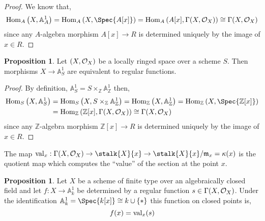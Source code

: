 \documentclass[12pt]{extarticle}
\newcommand{\Hom}[3]{\mathrm{Hom}_{#1}\left( #2, #3 \right)}
\newcommand{\Z}{\mathbb{Z}}
\theoremstyle{definition}
\newtheorem{proposition}[theorem]{Proposition}
\newenvironment{definition}[1][Definition:]{\begin{trivlist}
\item[\hskip \labelsep {\bfseries #1}]}{\end{trivlist}}
\newcommand{\m}{\mathfrak{m}}
\newcommand{\A}{\mathbb{A}}
\begin{document}
\begin{proof}
We know that,
\[ \Hom{A}{X}{\A^1_A} = \Hom{A}{X}{\Spec{A[x]}} = \Hom{A}{A[x]}{\Gamma(X, \struct{X})} \cong \Gamma(X, \struct{X}) \]
since any $A$-algebra morphism $A[x] \to R$ is determined uniquely by the image of $x \in R$. 
\end{proof}

\begin{proposition}
Let $(X, \mathcal{O}_{X})$ be a locally ringed space over a scheme $S$. Then morphisms $X \to \A^1_S$ are equivalent to regular functions.
\end{proposition}

\begin{proof}
By definition, $\A^1_S = S \times_\Z \A^1_\Z$ then,
\begin{align*}
\Hom{S}{X}{\A^1_S} & = \Hom{S}{X}{S \times_\Z \A^1_\Z} = \Hom{\Z}{X}{\A^1_\Z} = \Hom{\Z}{X}{\Spec{\Z[x]}} 
\\
& = \Hom{\Z}{\Z[x]}{\Gamma(X, \struct{X})} \cong \Gamma(X, \struct{X})
\end{align*}
since any $\Z$-algebra morphism $\Z[x] \to R$ is determined uniquely by the image of $x \in R$. 
\end{proof}

\begin{definition}
The map $\val_x : \Gamma(X, \struct{X}) \to \stalk{X}{x} \to \stalk{X}{x} / \m_x = \kappa(x)$ is the quotient map which computes the ``value'' of the section at the point $x$. 
\end{definition}


\begin{proposition}
Let $X$ be a scheme of finite type over an algebraically closed field and let $f : X \to \A^1_k$ be determined by a regular function $s \in \Gamma(X, \mathcal{O}_{X})$. Under the identification $\A^1_k = \Spec{k[x]} \cong k \cup \{ * \}$ this function on closed points is,
\[ f(x) = \mathrm{val}_x(s) \]
\end{proposition}
\end{document}
